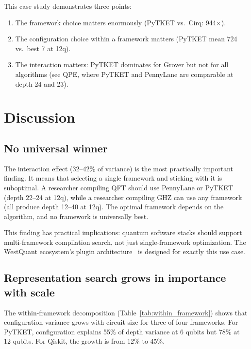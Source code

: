 \documentclass[11pt,a4paper]{article}
\begin{document}
This case study demonstrates three points:
\begin{enumerate}[noitemsep]
\item The framework choice matters enormously (PyTKET vs.\ Cirq: 944$\times$).
\item The configuration choice within a framework matters (PyTKET mean 724 vs.\ best 7 at 12q).
\item The interaction matters: PyTKET dominates for Grover but not for all algorithms (see QPE, where PyTKET and PennyLane are comparable at depth 24 and 23).
\end{enumerate}


\section{Discussion}

\subsection{No universal winner}

The interaction effect (32--42\% of variance) is the most practically important finding. It means that selecting a single framework and sticking with it is suboptimal. A researcher compiling QFT should use PennyLane or PyTKET (depth 22--24 at 12q), while a researcher compiling GHZ can use any framework (all produce depth 12--40 at 12q). The optimal framework depends on the algorithm, and no framework is universally best.

This finding has practical implications: quantum software stacks should support multi-framework compilation search, not just single-framework optimization. The WestQuant ecosystem's plugin architecture~\cite{ref12} is designed for exactly this use case.

\subsection{Representation search grows in importance with scale}

The within-framework decomposition (Table~\ref{tab:within_framework}) shows that configuration variance grows with circuit size for three of four frameworks. For PyTKET, configuration explains 55\% of depth variance at 6 qubits but 78\% at 12 qubits. For Qiskit, the growth is from 12\% to 45\%.
\end{document}
